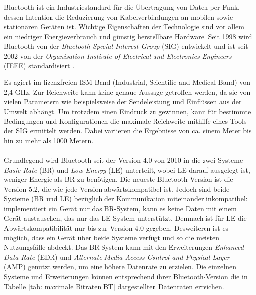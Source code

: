 Bluetooth ist ein Industriestandard für die Übertragung von Daten per Funk, dessen Intention die Reduzierung von Kabelverbindungen an mobilen sowie stationären Geräten ist. Wichtige Eigenschaften der Technologie sind vor allem ein niedriger Energieverbrauch und günstig herstellbare Hardware. Seit 1998 wird Bluetooth von der \textit{Bluetooth Special Interest Group} (SIG) entwickelt und ist seit 2002 von der \textit{Organisation Institute of Electrical and Electronics Engineers} (IEEE) standardisiert \cite{IEEE}.

Es agiert im lizenzfreien ISM-Band (Industrial, Scientific and Medical Band) von 2,4 GHz. 
Zur Reichweite kann keine genaue Aussage getroffen werden, da sie von vielen Parametern wie beispielsweise der Sendeleistung und Einflüssen aus der Umwelt abhängt. Um trotzdem einen Eindruck zu gewinnen, kann für bestimmte Bedingungen und Konfigurationen die maximale Reichweite mithilfe eines Tools \cite{BtRangeTool} der SIG ermittelt werden. Dabei variieren die Ergebnisse von ca. einem Meter bis hin zu mehr als 1000 Metern.
\\\\
Grundlegend wird Bluetooth seit der Version 4.0 von 2010 in die zwei Systeme \textit{Basic Rate} (BR) und \textit{Low Energy} (LE) unterteilt, wobei LE darauf ausgelegt ist, weniger Energie als BR zu benötigen. Die neueste Bluetooth-Version ist die Version 5.2, die wie jede Version abwärtskompatibel ist. Jedoch sind beide Systeme (BR und LE) bezüglich der Kommunikation miteinander inkompatibel: implementiert ein Gerät nur das BR-System, kann es keine Daten mit einem Gerät austauschen, das nur das LE-System unterstützt. Demnach ist für LE die Abwärtskompatibilität nur bis zur Version 4.0 gegeben. Desweiteren ist es möglich, dass ein Gerät über beide Systeme verfügt und so die meisten Nutzungsfälle abdeckt. Das BR-System kann mit den Erweiterungen \textit{Enhanced Data Rate} (EDR) und \textit{Alternate Media Access Control and Physical Layer} (AMP) genutzt werden, um eine höhere Datenrate zu erzielen. Die einzelnen Systeme und Erweiterungen können entsprechend ihrer Bluetooth-Version die in Tabelle \ref{tab: maximale Bitraten BT} dargestellten Datenraten erreichen.\\


